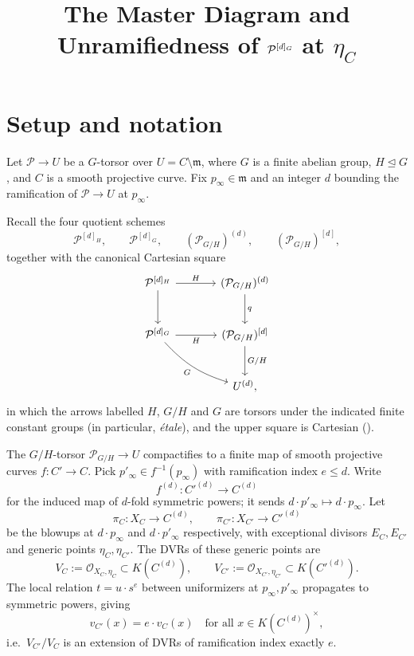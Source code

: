 \documentclass[12pt]{amsart}
\title{The Master Diagram and Unramifiedness of $\cP^{[d]_G}$ at $\eta_C$}
\author{}
\date{}
\newcommand{\cP}{\mathcal{P}}
\newcommand{\mdls}{\mathfrak{m}}
\theoremstyle{remark}
\begin{document}
\maketitle

\section{Setup and notation}

Let $\cP \to U$ be a $G$-torsor over $U = C \setminus \mdls$, where $G$ is a
finite abelian group, $H \trianglelefteq G$, and $C$ is a smooth projective
curve. Fix $p_\infty \in \mdls$ and an integer $d$ bounding the ramification
of $\cP \to U$ at $p_\infty$.

Recall the four quotient schemes
\[
\cP^{[d]_H},\qquad \cP^{[d]_G},\qquad (\cP_{G/H})^{(d)},\qquad (\cP_{G/H})^{[d]},
\]
together with the canonical Cartesian square
\[
\begin{tikzcd}[row sep=large, column sep=large]
\cP^{[d]_H} \ar[r,"H"] \ar[d]
  & (\cP_{G/H})^{(d)} \ar[d,"q"] \\
\cP^{[d]_G} \ar[r,"H"'] \ar[dr,"G"',bend right=15]
  & (\cP_{G/H})^{[d]} \ar[d,"G/H"] \\
  & U^{(d)},
\end{tikzcd}
\]
in which the arrows labelled $H$, $G/H$ and $G$ are torsors under the
indicated finite constant groups (in particular, \emph{\'etale}), and the
upper square is Cartesian ().

The $G/H$-torsor $\cP_{G/H} \to U$ compactifies to a finite map of smooth
projective curves $f \colon C' \to C$. Pick $p'_\infty \in f^{-1}(p_\infty)$
with ramification index $e \le d$. Write
\[
f^{(d)} \colon C'^{(d)} \to C^{(d)}
\]
for the induced map of $d$-fold symmetric powers; it sends
$d \cdot p'_\infty \mapsto d \cdot p_\infty$. Let
\[
\pi_C \colon X_C \to C^{(d)},\qquad \pi_{C'} \colon X_{C'} \to C'^{(d)}
\]
be the blowups at $d \cdot p_\infty$ and $d \cdot p'_\infty$ respectively, with
exceptional divisors $E_C,E_{C'}$ and generic points $\eta_C,\eta_{C'}$. The
DVRs of these generic points are
\[
V_C := \mathcal{O}_{X_C,\eta_C} \subset K(C^{(d)}),\qquad
V_{C'} := \mathcal{O}_{X_{C'},\eta_{C'}} \subset K(C'^{(d)}).
\]
The local relation $t = u\cdot s^{e}$ between uniformizers at
$p_\infty,p'_\infty$ propagates to symmetric powers, giving
\[
v_{C'}(x) = e\cdot v_C(x) \quad\text{for all }x \in K(C^{(d)})^{\times},
\]
i.e.\ $V_{C'}/V_C$ is an extension of DVRs of ramification index exactly $e$.
\end{document}
